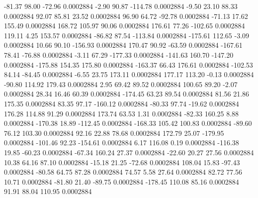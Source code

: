       -81.37       98.00      -72.96     0.0002884
       -2.90       90.87     -114.78     0.0002884
       -9.50       23.10       88.33     0.0002884
       92.07       85.81       23.52     0.0002884
       96.90       64.72      -92.78     0.0002884
      -71.13       17.62      155.49     0.0002884
      168.72      105.97       90.06     0.0002884
      176.61       77.26     -102.65     0.0002884
      119.11        4.25      153.57     0.0002884
      -86.82       87.54     -113.84     0.0002884
     -175.61      112.65       -3.09     0.0002884
       10.66       90.10     -156.93     0.0002884
      170.47       90.92      -63.59     0.0002884
     -167.61       78.41      -76.88     0.0002884
       -3.11       67.29     -177.33     0.0002884
     -141.63      160.70     -147.20     0.0002884
     -175.88      154.35      175.80     0.0002884
     -163.37       66.43      176.61     0.0002884
     -102.53       84.14      -84.45     0.0002884
       -6.55       23.75      173.11     0.0002884
      177.17      113.20       -0.13     0.0002884
      -90.80      114.92      179.43     0.0002884
        2.95       69.42       89.52     0.0002884
      100.65       89.20       -2.07     0.0002884
       28.34       16.46       60.39     0.0002884
     -174.45       63.23       89.54     0.0002884
       81.56       21.86      175.35     0.0002884
       83.35       97.17     -160.12     0.0002884
      -80.33       97.74      -19.62     0.0002884
      176.28      114.88       91.29     0.0002884
      173.74       63.53        1.31     0.0002884
      -82.33      160.25        8.88     0.0002884
     -170.38       18.89     -112.45     0.0002884
     -168.33      105.42      100.83     0.0002884
      -89.60       76.12      103.30     0.0002884
       92.16       22.88       78.68     0.0002884
      172.79       25.07     -179.95     0.0002884
     -101.46       92.23     -154.61     0.0002884
        6.17      116.08        0.19     0.0002884
     -116.38       19.85      -60.23     0.0002884
      -67.34      160.24       27.37     0.0002884
      -22.60       20.27       27.56     0.0002884
       10.38       64.16       87.10     0.0002884
      -15.18       21.25      -72.68     0.0002884
      108.04       15.83      -97.43     0.0002884
      -80.58       64.75       87.28     0.0002884
       74.57        5.58       27.64     0.0002884
       82.72       77.56       10.71     0.0002884
      -81.80       21.40      -89.75     0.0002884
     -178.45      110.08       85.16     0.0002884
       91.91       88.04      110.95     0.0002884

